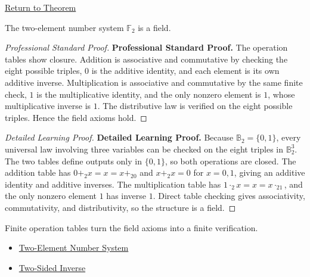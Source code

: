 \newpage
{}
\label{prf:two-element-system-is-field}

\begin{remark*}[Return]
\hyperref[thm:two-element-system-is-field]{Return to Theorem}
\end{remark*}

\begin{theorem*}
The two-element number system \(\mathbb{F}_2\) is a field.
\end{theorem*}

\begin{proof}[Professional Standard Proof]
\LRAProofBodyStart
\textbf{Professional Standard Proof.}
The operation tables show closure. Addition is associative and commutative by
checking the eight possible triples, \(0\) is the additive identity, and each
element is its own additive inverse. Multiplication is associative and
commutative by the same finite check, \(1\) is the multiplicative identity,
and the only nonzero element is \(1\), whose multiplicative inverse is \(1\).
The distributive law is verified on the eight possible triples. Hence the
field axioms hold.
\end{proof}

\begin{proof}[Detailed Learning Proof]
\LRAProofBodyStart
\textbf{Detailed Learning Proof.}
Because \(\mathbb{B}_2=\{0,1\}\), every universal law involving three
variables can be checked on the eight triples in \(\mathbb{B}_2^3\). The two
tables define outputs only in \(\{0,1\}\), so both operations are closed.
The addition table has \(0+_2x=x=x+_20\) and
\(x+_2x=0\) for \(x=0,1\), giving an additive identity and additive inverses.
The multiplication table has \(1\cdot_2x=x=x\cdot_21\), and the only nonzero
element \(1\) has inverse \(1\). Direct table checking gives associativity,
commutativity, and distributivity, so the structure is a field.
\end{proof}

\begin{remark*}
Finite operation tables turn the field axioms into a finite verification.
\end{remark*}

\begin{dependencies}
\begin{itemize}
  \item \hyperref[def:two-element-number-system]{Two-Element Number System}
  \item \hyperref[def:two-sided-inverse]{Two-Sided Inverse}
\end{itemize}
\end{dependencies}

\clearpage
